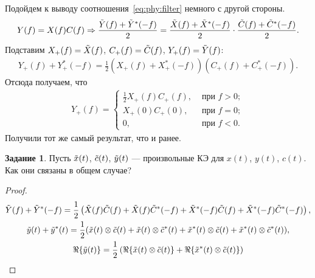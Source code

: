 \documentclass{book}
\numberwithin{theorem}{chapter}
\numberwithin{statement}{chapter}
\numberwithin{lemma}{chapter}
\theoremstyle{definition}
\newtheorem{task}{Задание}
\numberwithin{task}{chapter}
\theoremstyle{remark}
\numberwithin{example}{chapter}
\theoremstyle{definition}
\numberwithin{definition}{chapter}
\theoremstyle{remark}
\theoremstyle{remark}
\numberwithin{lyrics}{section}
\begin{document}
Подойдем к выводу соотношения~\eqref{eq:phy:filter} немного с другой стороны.
\begin{gather*}
Y(f) = X(f) C(f) \Rightarrow \frac{\tilde{Y}(f) + \tilde{Y}^*(-f)}{2} = \frac{\tilde{X}(f) + \tilde{X}^*(-f)}{2} \cdot \frac{\tilde{C}(f) + \tilde{C}^*(-f)}{2}.
\end{gather*}
Подставим $X_+(f) = \tilde{X}(f)$, $C_+(f) = \tilde{C}(f)$, $Y_+(f) = \tilde{Y}(f)$:
\begin{gather*}
Y_+(f) + Y_+^*(-f) = \frac{1}{2}(X_+(f) + X_+^*(-f)) (C_+(f) + C_+^*(-f)).
\end{gather*}
Отсюда получаем, что
\begin{gather}
Y_+(f) =
\begin{cases} 
\frac{1}{2} X_+(f) C_+(f), &\text{ при } f > 0;\\
X_+(0) C_+(0), &\text{ при } f = 0; \\
0, &\text{ при } f < 0.
\end{cases}
\end{gather}
Получили тот же самый результат, что и ранее.

\begin{task}
Пусть $\tilde{x}(t)$, $\tilde{c}(t)$, $\tilde{y}(t)$ --- произвольные КЭ для $x(t)$, $y(t)$, $c(t)$. Как они связаны в общем случае?
\end{task}
\begin{proof}
\begin{gather*}
\tilde{Y}(f) + \tilde{Y}^*(-f) = \frac{1}{2}\left(\tilde{X}(f) \tilde{C}(f) + \tilde{X}(f) \tilde{C}^*(-f) + \tilde{X}^*(-f) \tilde{C}(f) + 
\tilde{X}^*(-f) \tilde{C}^*(-f) \right),\\
\tilde{y}(t) + \tilde{y}^*(t) = \frac{1}{2} (\tilde{x}(t) \otimes \tilde{c}(t) + \tilde{x}(t) \otimes \tilde{c}^*(t) +  \tilde{x}^*(t) \otimes \tilde{c}(t) + \tilde{x}^*(t) \otimes \tilde{c}^*(t)), \\
\Re \{\tilde{y}(t)\} = \frac{1}{2} \left(\Re\{\tilde{x}(t) \otimes \tilde{c}(t)\} + \Re\{\tilde{x}^*(t) \otimes \tilde{c}(t)\} \right)
\end{gather*}
\end{proof}
\end{document}
